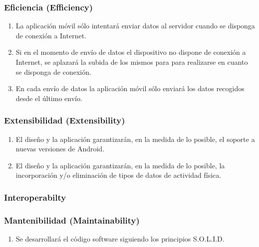         \subsubsection{Eficiencia (Efficiency)}
            \begin{enumerate}[label=\textbf{\texttt{RNF-\arabic*}}]
                \item La aplicación móvil sólo intentará enviar datos al servidor cuando se disponga de conexión a Internet.
                \item Si en el momento de envío de datos el dispositivo no dispone de conexión a Internet, se aplazará la subida de los mismos para para realizarse en cuanto se disponga de conexión.
                \item En cada envío de datos la aplicación móvil sólo enviará los datos recogidos desde el último envío.
            \end{enumerate}
        \subsubsection{Extensibilidad (Extensibility)}
            \begin{enumerate}[resume, label=\textbf{\texttt{RNF-\arabic*}}]
                \item El diseño y la aplicación garantizarán, en la medida de lo posible, el soporte a nuevas versiones de Android.
                \item El diseño y la aplicación garantizarán, en la medida de lo posible, la incorporación y/o eliminación de tipos de datos de actividad física.
            \end{enumerate}
        \subsubsection{Interoperabilty}
        \subsubsection{Mantenibilidad (Maintainability)}
            \begin{enumerate}[resume, label=\textbf{\texttt{RNF-\arabic*}}]
                \item Se desarrollará el código software siguiendo los principios S.O.L.I.D.
            \end{enumerate}
